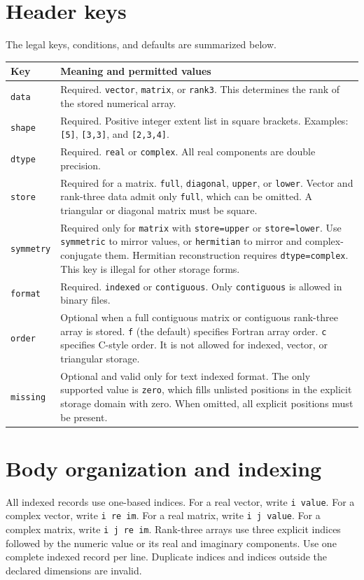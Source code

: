\section{Header keys}\label{sec-numfile-header}
The legal keys, conditions, and defaults are summarized below.
\begin{longtable}{p{}p{}}
\rowcolor{backgray}\textbf{Key} & \textbf{Meaning and permitted values}\\\hline
\texttt{data} & Required. \texttt{vector}, \texttt{matrix}, or \texttt{rank3}. This determines the rank of the stored numerical array.\\
\texttt{shape} & Required. Positive integer extent list in square brackets. Examples: \texttt{[5]}, \texttt{[3,3]}, and \texttt{[2,3,4]}.\\
\texttt{dtype} & Required. \texttt{real} or \texttt{complex}. All real components are double precision.\\
\texttt{store} & Required for a matrix. \texttt{full}, \texttt{diagonal}, \texttt{upper}, or \texttt{lower}. Vector and rank-three data admit only \texttt{full}, which can be omitted. A triangular or diagonal matrix must be square.\\
\texttt{symmetry} & Required only for \texttt{matrix} with \texttt{store=upper} or \texttt{store=lower}. Use \texttt{symmetric} to mirror values, or \texttt{hermitian} to mirror and complex-conjugate them. Hermitian reconstruction requires \texttt{dtype=complex}. This key is illegal for other storage forms.\\
\texttt{format} & Required. \texttt{indexed} or \texttt{contiguous}. Only \texttt{contiguous} is allowed in binary files.\\
\texttt{order} & Optional when a full contiguous matrix or contiguous rank-three array is stored. \texttt{f} (the default) specifies Fortran array order. \texttt{c} specifies C-style order. It is not allowed for indexed, vector, or triangular storage.\\
\texttt{missing} & Optional and valid only for text indexed format. The only supported value is \texttt{zero}, which fills unlisted positions in the explicit storage domain with zero. When omitted, all explicit positions must be present.\\\hline
\end{longtable}

\section{Body organization and indexing}
All indexed records use one-based indices. For a real vector, write \texttt{i value}. For a complex vector, write \texttt{i re im}. For a real matrix, write \texttt{i j value}. For a complex matrix, write \texttt{i j re im}. Rank-three arrays use three explicit indices followed by the numeric value or its real and imaginary components. Use one complete indexed record per line. Duplicate indices and indices outside the declared dimensions are invalid.

